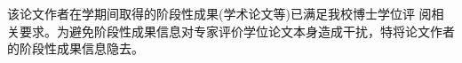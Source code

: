 \begin{resume}
	
  该论文作者在学期间取得的阶段性成果(学术论文等)已满足我校博士学位评 阅相关要求。为避免阶段性成果信息对专家评价学位论文本身造成干扰，特将论文作者的阶段性成果信息隐去。
  
%
%
\end{resume}
